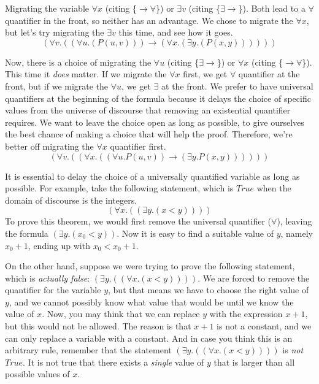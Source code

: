 {Migrating the variable $\forall x$ (citing \{$\rightarrow\forall$\})
or $\exists v$ (citing \{$\exists\rightarrow$\}).
Both lead to a $\forall$ quantifier in the front,
so neither has an advantage.
We chose to migrate the $\forall x$, but let's try migrating
the $\exists v$ this time, and see how it goes.
$$(\forall v.((\forall u.(P(u, v))) \rightarrow (\forall x.(\exists y.(P(x, y))))))$$

Now, there is a choice of migrating the $\forall u$ (citing \{$\exists\rightarrow$\})
or $\forall x$ (citing \{$\rightarrow\forall$\}).
This time it \emph{does} matter.
If we migrate the $\forall x$ first, we get $\forall$ quantifier at the front,
but if we migrate the $\forall u$, we get $\exists$ at the front.
We prefer to have universal quantifiers at the beginning of the formula
because it delays the choice of specific values from the universe of discourse
that removing an existential quantifier requires.
We want to leave the choice open as long as possible, to give ourselves
the best chance of making a choice that will help the proof.
Therefore, we're better off migrating the $\forall x$ quantifier first.
$$(\forall v.((\forall x.((\forall u.P(u, v)) \rightarrow (\exists y.P(x, y))))))$$

It is essential to delay the choice of a universally quantified variable
as long as possible.
For example, take the following statement, which is $True$
when the domain of discourse is the integers.
$$(\forall x.((\exists y.(x < y))))$$
To prove this theorem, we would first remove the universal quantifier ($\forall$),
leaving the formula $(\exists y.(x_0 < y))$.
Now it is easy to find a suitable value of $y$, namely $x_0+1$, ending up with
$x_0 < x_0 + 1$.

On the other hand, suppose we were trying to prove the following statement, which
is \emph{actually false}:
$(\exists y.((\forall x.(x < y))))$.
We are forced to remove the quantifier for the variable $y$, but that means we have
to choose the right value of $y$, and we cannot possibly know what value that would be
until we know the value of $x$.
Now, you may think that we can replace $y$ with the expression $x+1$, but this would
not be allowed. The reason is that $x+1$ is not a constant, and we can
only replace a variable with a constant. And in case you think this is an arbitrary
rule, remember that the statement $(\exists y.((\forall x.(x < y))))$ is \emph{not}
$True$. It is not true that there exists a \emph{single} value of $y$ that is larger
than all possible values of $x$.

}
